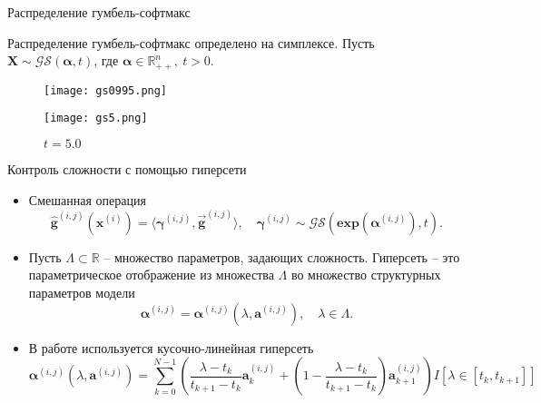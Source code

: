 \documentclass[aspectratio=169]{beamer}
\begin{document}
\begin{frame}{Распределение гумбель-софтмакс}

Распределение гумбель-софтмакс определено на симплексе. Пусть $\boldsymbol X \sim \mathcal{GS}(\boldsymbol\alpha, t)$, где
$\boldsymbol\alpha \in \mathbb{R}^n_{++}, ~t > 0$.

\begin{figure}
 \begin{minipage}[t]{.2\textwidth}
        \centering
{}
\caption*{$t\to0$}
\end{minipage}
\hfill
 \begin{minipage}[t]{.2\textwidth}
   \texttt{[image: gs0995.png]}
\caption*{$t=0.995$}
\end{minipage}
\hfill
 \begin{minipage}[t]{.2\textwidth}
   \texttt{[image: gs5.png]}
\caption*{$t=5.0$}
\end{minipage}

\end{figure}


\end{frame}


\begin{frame}{Контроль сложности с помощью гиперсети}
\begin{itemize}
\item Смешанная операция
\[
\hat{\boldsymbol g}^{(i, j)}(\boldsymbol x^{(i)}) = \langle\boldsymbol \gamma^{(i, j)}, \vec{\boldsymbol g}^{(i, j)}\rangle, \quad \boldsymbol\gamma^{(i, j)} \sim \mathcal{GS}(\boldsymbol{exp}(\boldsymbol\alpha^{(i, j)}), t).
\]
\item Пусть $\Lambda \subset \mathbb{R}$ -- множество параметров, задающих сложность. Гиперсеть -- это параметрическое отображение из множества $\Lambda$ во множество структурных параметров модели
\[
\boldsymbol\alpha^{(i, j)} = \boldsymbol\alpha^{(i, j)}(\lambda, \boldsymbol{a}^{(i, j)}), \quad \lambda \in \Lambda.
\]
\item В работе используется кусочно-линейная гиперсеть
\[
\boldsymbol\alpha^{(i, j)}(\lambda, \boldsymbol{a}^{(i, j)}) = \sum_{k=0}^{N-1}\left(\frac{\lambda - t_k}{t_{k+1}-t_k}\boldsymbol{a}_k^{(i, j)} + \left(1 - \frac{\lambda - t_k}{t_{k+1}-t_k}\right)\boldsymbol{a}_{k+1}^{(i, j)}\right)I[\lambda \in [t_k, t_{k+1}]]
\]
\end{itemize}
\end{frame}
\end{document}
